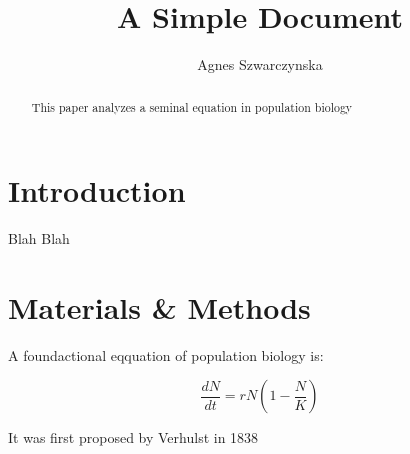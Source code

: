 \documentclass[12pt]{article}
\title{A Simple Document}
\author{Agnes Szwarczynska}
\date{}
\begin{document}
    \maketitle

    \begin{abstract}
        This paper analyzes a seminal equation in population biology
    \end{abstract}

    \section{Introduction}
    
    Blah Blah

    \section{Materials \& Methods}

    A foundactional eqquation of population biology is:

    \begin{equation}
        \frac{dN}{dt} = r N (1 - \frac{N}{K})
    \end{equation}

    It was first proposed by Verhulst in 1838 \cite{verhulst1838notice}

    

    
\end{document}

